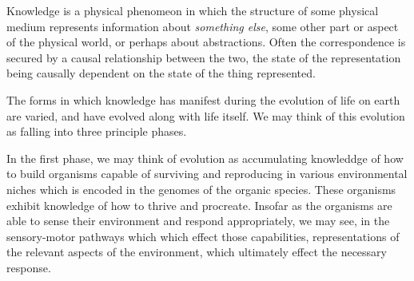 


Knowledge is a physical phenomeon in which the structure of some physical medium represents information about \emph{something else},
some other part or aspect of the physical world, or perhaps about abstractions.
Often the correspondence is secured by a causal relationship between the two, the state of the representation being causally dependent on the state of the thing represented.

The forms in which knowledge has manifest during the evolution of life on earth are varied, and have evolved along with life itself.
We may think of this evolution as falling into three principle phases.

In the first phase, we may think of evolution as accumulating knowleddge of how to build organisms capable of surviving and reproducing in various environmental niches which is encoded in the genomes of the organic species.
These organisms exhibit knowledge of how to thrive and procreate.
Insofar as the organisms are able to sense their environment and respond appropriately, we may see, in the sensory-motor pathways which which effect those capabilities, representations of the relevant aspects of the environment, which ultimately effect the necessary response.

\section{}

